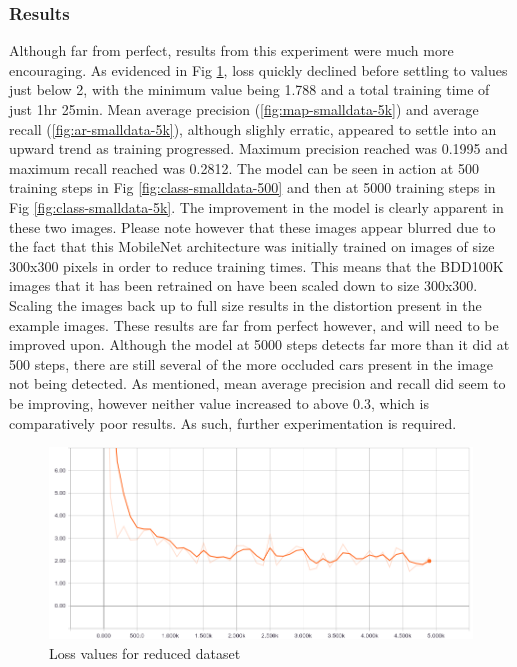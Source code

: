 \documentclass[12pt]{report}
\begin{document}
\subsubsection*{Results}
\begin{flushleft}
Although far from perfect, results from this experiment were much more encouraging. As evidenced in Fig \ref{fig:loss-smalldata-5k}, loss quickly declined before settling to values just below 2, with the minimum value being 1.788 and a total training time of just 1hr 25min. Mean average precision (\ref{fig:map-smalldata-5k}) and average recall (\ref{fig:ar-smalldata-5k}), although slighly erratic, appeared to settle into an upward trend as training progressed. Maximum precision reached was 0.1995 and maximum recall reached was 0.2812. The model can be seen in action at 500 training steps in Fig \ref{fig:class-smalldata-500} and then at 5000 training steps in Fig \ref{fig:class-smalldata-5k}. The improvement in the model is clearly apparent in these two images. Please note however that these images appear blurred due to the fact that this MobileNet architecture was initially trained on images of size 300x300 pixels in order to reduce training times. This means that the BDD100K images that it has been retrained on have been scaled down to size 300x300. Scaling the images back up to full size results in the distortion present in the example images. These results are far from perfect however, and will need to be improved upon. Although the model at 5000 steps detects far more than it did at 500 steps, there are still several of the more occluded cars present in the image not being detected. As mentioned, mean average precision and recall did seem to be improving, however neither value increased to above 0.3, which is comparatively poor results. As such, further experimentation is required.
\end{flushleft}

\vspace{0.5cm}
\begin{figure}[ht!]
	\centering
	\includegraphics[width=12cm]{loss-smalldata-5k}
	\caption{Loss values for reduced dataset}
	\label{fig:loss-smalldata-5k}
\end{figure}
\end{document}
